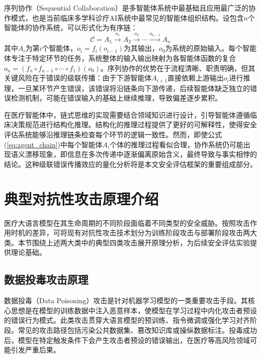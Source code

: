 序列协作（Sequential Collaboration）是多智能体系统中最基础且应用最广泛的协作模式，也是当前临床多学科诊疗AI系统中最常见的智能体组织结构。设包含$n$个智能体的协作系统，可以形式化为有序链：
\begin{equation}
\mathcal{C} = A_1 \xrightarrow{o_1} A_2 \xrightarrow{o_2} \cdots \xrightarrow{o_{n-1}} A_n
\label{eq:agent_chain}
\end{equation}
其中$A_i$为第$i$个智能体，$o_i = f_i(o_{i-1})$为其输出，$o_0$为系统的原始输入。每个智能体专注于特定环节的任务，系统整体的输入输出映射为各智能体函数的复合$o_n = (f_n \circ f_{n-1} \circ \cdots \circ f_1)(o_0)$。序列协作的优势在于流程清晰、职责明确，但其关键风险在于错误的级联传播：由于下游智能体$A_{i+1}$直接依赖上游输出$o_i$进行推理，一旦某环节产生错误，该错误将沿链条向下游传递，后续智能体缺乏独立的错误检测机制，可能在错误输入的基础上继续推理，导致偏差逐步累积。

在医疗智能体中，链式思维的实现需要结合领域知识进行设计，引导智能体遵循临床决策规范进行结构化推理。结构化的推理过程提供了更好的可解释性，使得安全评估系统能够沿推理链条检查每个环节的逻辑一致性。然而，即使公式(\ref{eq:agent_chain})中每个智能体$A_i$个体的推理过程看似合理，协作系统仍可能出现语义漂移现象，即信息在多次传递中逐渐偏离原始含义，最终导致与事实相悖的结论。这种级联错误传播效应的量化分析将是本文安全评估框架的重要组成部分。

\section{典型对抗性攻击原理介绍}
\label{sec:attack_mechanisms}

医疗大语言模型在其生命周期的不同阶段面临着不同类型的安全威胁。按照攻击作用时机的差异，可将现有对抗性攻击技术划分为训练阶段攻击与部署阶段攻击两大类。本节围绕上述两大类中的典型四类攻击展开原理分析，为后续安全评估实验提供理论基础。

\subsection{数据投毒攻击原理}
\label{subsec:data_poisoning}

数据投毒（Data Poisoning）攻击是针对机器学习模型的一类重要攻击手段\cite{fan2022poisoning}。其核心思想是在模型的训练数据中注入恶意样本，使模型在学习过程中内化攻击者预设的错误行为模式。此类攻击贯穿大语言模型的预训练、指令微调或强化学习对齐阶段。常见的攻击路径包括污染公共数据集、篡改知识库或操纵数据标注。投毒成功后，模型在特定触发条件下会产生攻击者预设的错误输出，在医疗等高风险领域可能引发严重后果。

